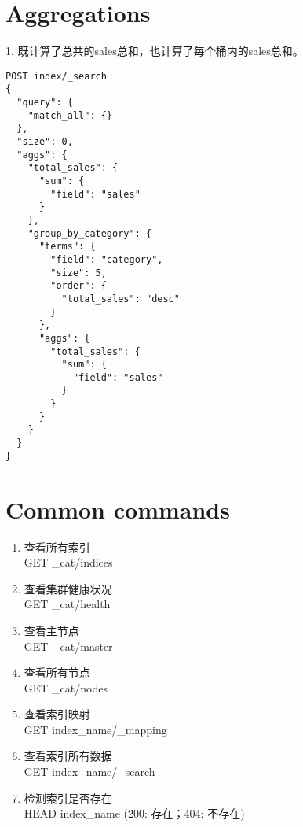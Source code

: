 \documentclass[]{exam}
\begin{document}
\begin{questions}
\section{Aggregations}
1. 既计算了总共的sales总和，也计算了每个桶内的sales总和。
\begin{verbatim}
POST index/_search
{
  "query": {
    "match_all": {}
  },
  "size": 0,
  "aggs": {
    "total_sales": {
      "sum": {
        "field": "sales"
      }
    },
    "group_by_category": {
      "terms": {
        "field": "category",
        "size": 5,
        "order": {
          "total_sales": "desc"
        }
      },
      "aggs": {
        "total_sales": {
          "sum": {
            "field": "sales"
          }
        }
      }
    }
  }
}
\end{verbatim}

\section{Common commands}
\begin{enumerate}
    \item 查看所有索引 \\
    GET \_cat/indices
    \item 查看集群健康状况 \\
    GET \_cat/health
    \item 查看主节点 \\ 
    GET \_cat/master
    \item 查看所有节点 \\ 
    GET \_cat/nodes
    \item 查看索引映射 \\
    GET index\_name/\_mapping
    \item 查看索引所有数据 \\
    GET index\_name/\_search
    \item 检测索引是否存在 \\
    HEAD index\_name (200: 存在；404: 不存在)
\end{enumerate}













\end{questions}
\end{document}
